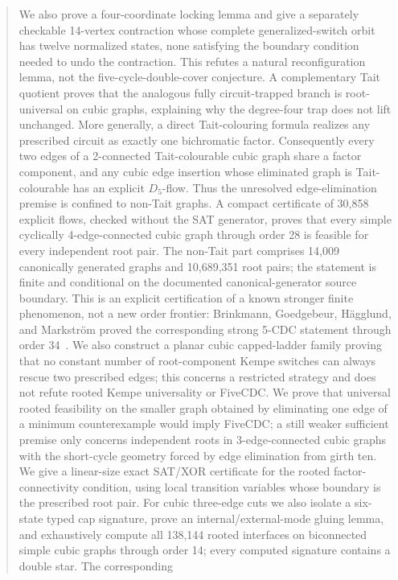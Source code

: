 \documentclass[11pt]{article}
\theoremstyle{definition}
\theoremstyle{remark}
\begin{document}
\begin{abstract}
We also prove a four-coordinate locking lemma and give a separately
checkable 14-vertex contraction whose complete generalized-switch orbit
has twelve normalized states, none satisfying the boundary condition
needed to undo the contraction.  This refutes a natural reconfiguration
lemma, not the five-cycle-double-cover conjecture.  A complementary Tait
quotient proves that the analogous fully circuit-trapped branch is
root-universal on cubic graphs, explaining why the degree-four trap does
not lift unchanged.  More generally, a direct Tait-colouring formula
realizes any prescribed circuit as exactly one bichromatic factor.
Consequently every two edges of a 2-connected Tait-colourable cubic graph
share a factor component, and any cubic edge insertion whose eliminated
graph is Tait-colourable has an explicit \(D_5\)-flow.  Thus the unresolved
edge-elimination premise is confined to non-Tait graphs.  A compact
certificate of 30,858 explicit flows, checked without the SAT generator,
proves that every simple cyclically 4-edge-connected cubic graph through
order 28 is feasible for every independent root pair.  The non-Tait part
comprises 14,009 canonically generated graphs and 10,689,351 root pairs; the
statement is finite and conditional on the documented canonical-generator
source boundary.  This is an explicit certification of a known stronger
finite phenomenon, not a new order frontier: Brinkmann, Goedgebeur,
H\"agglund, and Markstr\"om proved the corresponding strong 5-CDC statement
through order 34~\cite[Observation~6.6]{BrinkmannEtAl2013}.  We also construct
a planar cubic capped-ladder
family proving that no constant number of root-component Kempe switches
can always rescue two prescribed edges; this concerns a restricted
strategy and does not refute rooted Kempe universality or FiveCDC.
We prove that universal rooted feasibility on the smaller graph obtained
by eliminating one edge of a minimum counterexample would imply
FiveCDC; a still weaker sufficient premise only concerns independent
roots in 3-edge-connected cubic graphs with the short-cycle geometry
forced by edge elimination from girth ten.  We give a linear-size exact
SAT/XOR certificate for the rooted factor-connectivity condition, using
local transition variables whose boundary is the prescribed root pair.
For cubic three-edge cuts we also isolate a six-state typed cap signature,
prove an internal/external-mode gluing lemma, and exhaustively compute all
138,144 rooted interfaces on biconnected simple cubic graphs through order
14; every computed signature contains a double star.  The corresponding

\end{abstract}
\end{document}
